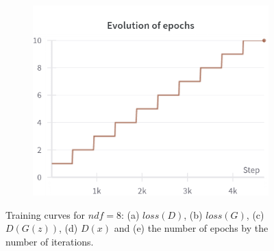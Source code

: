 \begin{figure}[H]
    \begin{subfigure}{0.45\textwidth}
        \centering
        \includegraphics[width=0.95\linewidth]{ndf/8/epochs.png}
        \caption{}
        \label{subfig:ndf/8/epochs}
    \end{subfigure}%

    \caption{Training curves for $ndf=8$: (a) $loss(D)$, (b) $loss(G)$, (c) $D(G(z))$, (d) $D(x)$ and (e) the number of epochs by the number of iterations.}
    \label{fig:ndf/8_losses}
\end{figure}


